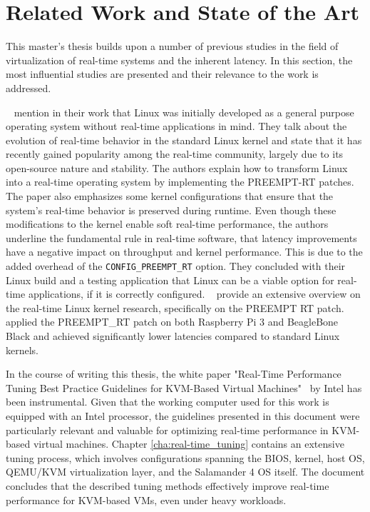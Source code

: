 \documentclass[MMR,Master,english]{twbook}
\begin{document}
\section{Related Work and State of the Art}
This master’s thesis builds upon a number of previous studies in the field of virtualization of real-time systems and the inherent latency. In this section, the most influential studies are presented and their relevance to the work is addressed.

\bigskip \noindent \citeauthor{perneelRealtimeCapabilitiesStandard2015}~\cite{perneelRealtimeCapabilitiesStandard2015} mention in their work that Linux was initially developed as a general purpose operating system without real-time applications in mind. They talk about the evolution of real-time behavior in the standard Linux kernel and state that it has recently gained popularity among the real-time community, largely due to its open-source nature and stability. The authors explain how to transform Linux into a real-time operating system by implementing the PREEMPT-RT patches. The paper also emphasizes some kernel configurations that ensure that the system's real-time behavior is preserved during runtime. Even though these modifications to the kernel enable soft real-time performance, the authors underline the fundamental rule in real-time software, that latency improvements have a negative impact on throughput and kernel performance. This is due to the added overhead of the \texttt{CONFIG\_PREEMPT\_RT} option. They concluded with their Linux build and a testing application that Linux can be a viable option for real-time applications, if it is correctly configured. \citeauthor{reghenzaniRealTimeLinuxKernel2020}~\cite{reghenzaniRealTimeLinuxKernel2020} provide an extensive overview on the real-time Linux kernel research, specifically on the PREEMPT RT patch. \citeauthor{adamRealTimePerformanceResponse2021}~\cite{adamRealTimePerformanceResponse2021} applied the PREEMPT\_RT patch on both Raspberry Pi 3 and BeagleBone Black and achieved significantly lower latencies compared to standard Linux kernels.

\bigskip \noindent In the course of writing this thesis, the white paper "Real-Time Performance Tuning Best Practice Guidelines for KVM-Based Virtual Machines"~\cite{RealTimePerformanceTuning2022} by Intel has been instrumental. Given that the working computer used for this work is equipped with an Intel processor, the guidelines presented in this document were particularly relevant and valuable for optimizing real-time performance in KVM-based virtual machines. Chapter \ref{cha:real-time_tuning} contains an extensive tuning process, which involves configurations spanning the BIOS, kernel, host OS, QEMU/KVM virtualization layer, and the Salamander 4 OS itself. The document concludes that the described tuning methods effectively improve real-time performance for KVM-based VMs, even under heavy workloads.
\end{document}
